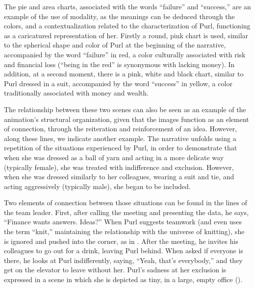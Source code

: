 \documentclass[english]{textolivre}
\begin{document}
The pie and area charts, associated with the words “failure” and “success,” are an example of the use of modality, as the meanings can be deduced through the colors, and a contextualization related to the characterization of Purl, functioning as a caricatured representation of her. Firstly a round, pink chart is used, similar to the spherical shape and color of Purl at the beginning of the narrative, accompanied by the word “failure” in red, a color culturally associated with risk and financial loss (“being in the red” is synonymous with lacking money). In addition, at a second moment, there is a pink, white and black chart, similar to Purl dressed in a suit, accompanied by the word “success” in yellow, a color traditionally associated with money and wealth. 

The relationship between these two scenes can also be seen as an example of the animation’s structural organization, given that the images function as an element of connection, through the reiteration and reinforcement of an idea. However, along these lines, we indicate another example. The narrative unfolds using a repetition of the situations experienced by Purl, in order to demonstrate that when she was dressed as a ball of yarn and acting in a more delicate way (typically female), she was treated with indifference and exclusion. However, when she was dressed similarly to her colleagues, wearing a suit and tie, and acting aggressively (typically male), she began to be included.

Two elements of connection between those situations can be found in the lines of the team leader. First, after calling the meeting and presenting the data, he says, “Finance wants answers. Ideas?” When Purl suggests teamwork (and even uses the term “knit,” maintaining the relationship with the universe of knitting), she is ignored and pushed into the corner, as in . After the meeting, he invites his colleagues to go out for a drink, leaving Purl behind. When asked if everyone is there, he looks at Purl indifferently, saying, “Yeah, that's everybody,” and they get on the elevator to leave without her. Purl’s sadness at her exclusion is expressed in a scene in which she is depicted as tiny, in a large, empty office (). 
\end{document}
